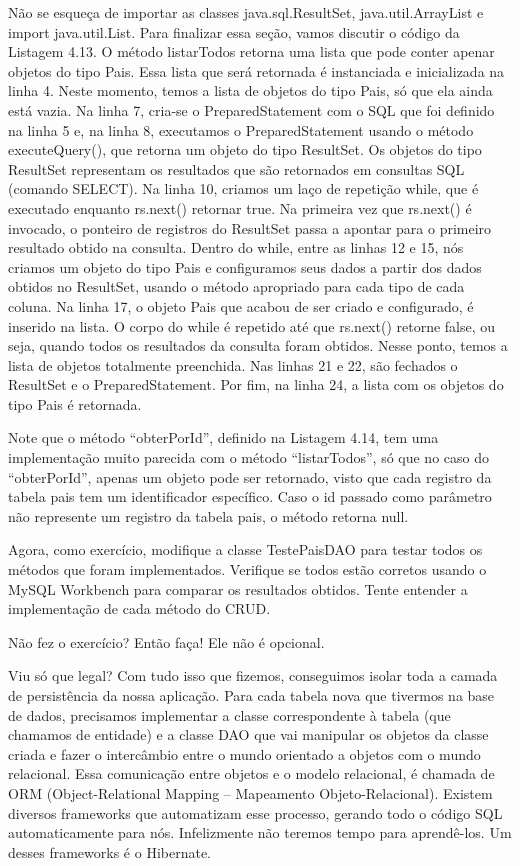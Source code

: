 Não se esqueça de importar as classes java.sql.ResultSet, java.util.ArrayList e import java.util.List. Para finalizar essa seção, vamos discutir o código da Listagem 4.13. O método listarTodos retorna uma lista que pode conter apenar objetos do tipo Pais. Essa lista que será retornada é instanciada e inicializada na linha 4. Neste momento, temos a lista de objetos do tipo Pais, só que ela ainda está vazia. Na linha 7, cria-se o PreparedStatement com o SQL que foi definido na linha 5 e, na linha 8, executamos o PreparedStatement usando o método executeQuery(), que retorna um objeto do tipo ResultSet. Os objetos do tipo ResultSet representam os resultados que são retornados em consultas SQL (comando SELECT). Na linha 10, criamos um laço de repetição while, que é executado enquanto rs.next() retornar true. Na primeira vez que rs.next() é invocado, o ponteiro de registros do ResultSet passa a apontar para o primeiro resultado obtido na consulta. Dentro do while, entre as linhas 12 e 15, nós criamos um objeto do tipo Pais e configuramos seus dados a partir dos dados obtidos no ResultSet, usando o método apropriado para cada tipo de cada coluna. Na linha 17, o objeto Pais que acabou de ser criado e configurado, é inserido na lista. O corpo do while é repetido até que rs.next() retorne false, ou seja, quando todos os resultados da consulta foram obtidos. Nesse ponto, temos a lista de objetos totalmente preenchida. Nas linhas 21 e 22, são fechados o ResultSet e o PreparedStatement. Por fim, na linha 24, a lista com os objetos do tipo Pais é retornada.

Note que o método ``obterPorId'', definido na Listagem 4.14, tem uma implementação muito parecida com o método ``listarTodos'', só que no caso do ``obterPorId'', apenas um objeto pode ser retornado, visto que cada registro da tabela pais tem um identificador específico. Caso o id passado como parâmetro não represente um registro da tabela pais, o método retorna null.

Agora, como exercício, modifique a classe TestePaisDAO para testar todos os métodos que foram implementados. Verifique se todos estão corretos usando o MySQL Workbench para comparar os resultados obtidos. Tente entender a implementação de cada método do CRUD.

Não fez o exercício? Então faça! Ele não é opcional.

Viu só que legal? Com tudo isso que fizemos, conseguimos isolar toda a camada de persistência da nossa aplicação. Para cada tabela nova que tivermos na base de dados, precisamos implementar a classe correspondente à tabela (que chamamos de entidade) e a classe DAO que vai manipular os objetos da classe criada e fazer o intercâmbio entre o mundo orientado a objetos com o mundo relacional. Essa comunicação entre objetos e o modelo relacional, é chamada de ORM (Object-Relational Mapping – Mapeamento Objeto-Relacional). Existem diversos frameworks que automatizam esse processo, gerando todo o código SQL automaticamente para nós. Infelizmente não teremos tempo para aprendê-los. Um desses frameworks é o Hibernate.

